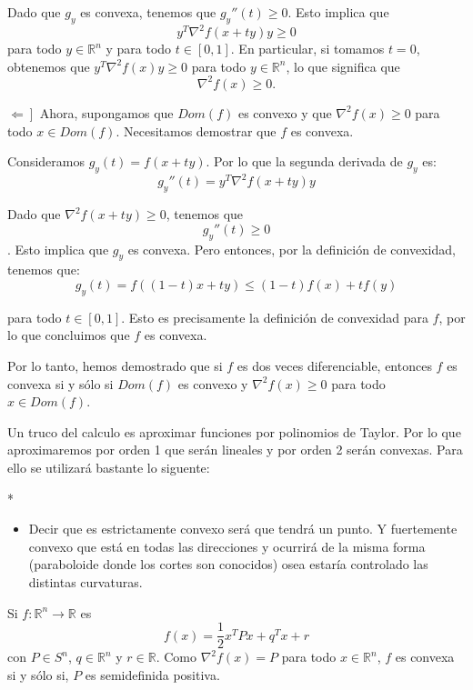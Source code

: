 \begin{paracol}{2}
{\begin{teo}
    Dado que $g_y$ es convexa, tenemos que $g_y''(t) \geq 0$. Esto implica que 
    $$y^T \nabla^2 f(x+ty) y \geq 0$$
    para todo $y \in \mathbb{R}^n$ y para todo $t \in [0,1]$. En particular, si tomamos $t=0$, obtenemos que $y^T \nabla^2 f(x) y \geq 0$ para todo $y \in \mathbb{R}^n$, lo que significa que 
    $$\nabla^2 f(x) \geq 0.$$

    $\left.\Leftarrow\right]$ Ahora, supongamos que $Dom(f)$ es convexo y que $\nabla^2 f(x) \geq 0$ para todo $x \in Dom(f)$. Necesitamos demostrar que $f$ es convexa.

    Consideramos $g_y(t) = f(x+ty)$. Por lo que la segunda derivada de $g_y$ es:
    $$g_y''(t) = y^T \nabla^2 f(x+ty) y$$

    Dado que $\nabla^2 f(x+ty) \geq 0$, tenemos que 
    $$g_y''(t) \geq 0$$. 
    Esto implica que $g_y$ es convexa. Pero entonces, por la definición de convexidad, tenemos que:
    $$g_y(t) = f((1-t)x + ty) \leq (1-t)f(x) + tf(y)$$

    para todo $t \in [0,1]$. Esto es precisamente la definición de convexidad para $f$, por lo que concluimos que $f$ es convexa.

    Por lo tanto, hemos demostrado que si $f$ es dos veces diferenciable, entonces $f$ es convexa si y sólo si $Dom(f)$ es convexo y $\nabla^2 f(x) \geq 0$ para todo $x \in Dom(f)$.
\end{teo}
}

\begin{tcolorbox}[colframe=white]
    Un truco del calculo es aproximar funciones por polinomios de Taylor. Por lo que aproximaremos por orden 1 que serán lineales y por orden 2 serán convexas. Para ello se utilizará bastante lo siguente:
\end{tcolorbox}

\switchcolumn[1]*{\noindent\scriptsize
    \begin{itemize}
	\item Decir que es estrictamente convexo será que tendrá un punto. Y fuertemente convexo que está en todas las direcciones y ocurrirá de la misma forma (paraboloide donde los cortes son conocidos) osea estaría controlado las distintas curvaturas.
    \end{itemize}
}
\switchcolumn[0]\noindent
\begin{ejem} Si $f:\mathbb{R}^n\to \mathbb{R}$ es
    $$f(x)=\dfrac{1}{2}x^T Px + q^T x +r$$
    con $P\in S^n$, $q\in \mathbb{R}^n$ y $r\in \mathbb{R}$. Como $\nabla^2f(x)=P$ para todo $x\in \mathbb{R}^n$, $f$ es convexa si y sólo si, $P$ es semidefinida positiva.
\end{ejem}


\end{paracol}
